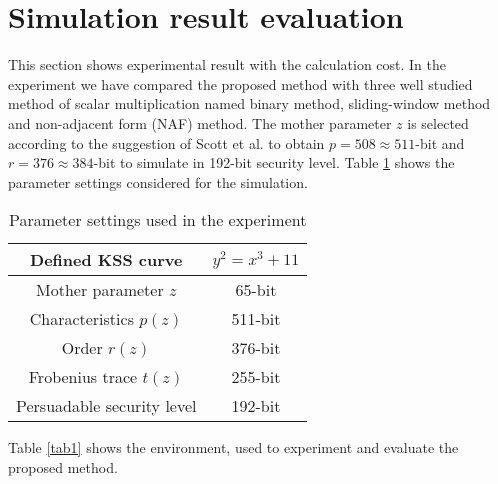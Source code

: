 \section{Simulation result evaluation}
This section shows experimental result with the calculation cost.
 In the experiment we have compared the proposed method with three well studied method of scalar multiplication named binary method, sliding-window method and non-adjacent form (NAF) method. 
The mother parameter $z$ is  selected according to the suggestion of Scott et al. \cite{kss_param} to obtain $p = 508 \approx 511$-bit and $r =  376 \approx 384$-bit  to simulate in 192-bit security level.
Table \ref{parameters} shows the parameter settings considered for the simulation.

\renewcommand{\baselinestretch}{1.5}
\begin{table}[htb]
	\begin{center}
		\caption{Parameter settings used in the experiment}
		\begin{tabular}{|c|c|}
			\hline
			Defined KSS curve & $y^2 = x^3 + 11$ \\ \hline
			Mother parameter $z$ & 65-bit \\ \hline
			Characteristics  $p(z)$ & 511-bit \\ \hline
			Order  $r(z)$ & 376-bit \\ \hline
			Frobenius trace $t(z)$ & 255-bit \\ \hline
			Persuadable security level & 192-bit \\ \hline
		\end{tabular}
		\label{parameters}
	\end{center}
\end{table}
\renewcommand{\baselinestretch}{1.0}

Table \ref{tab1} shows the environment, used to experiment and evaluate the proposed method.  
\renewcommand{\baselinestretch}{1.5}
\begin{table}[!ht]
\renewcommand{\arraystretch}{1.3}
\centering
\caption{ Computational Environment}
\label{tab1}
\end{table}
\renewcommand{\baselinestretch}{1.0}

